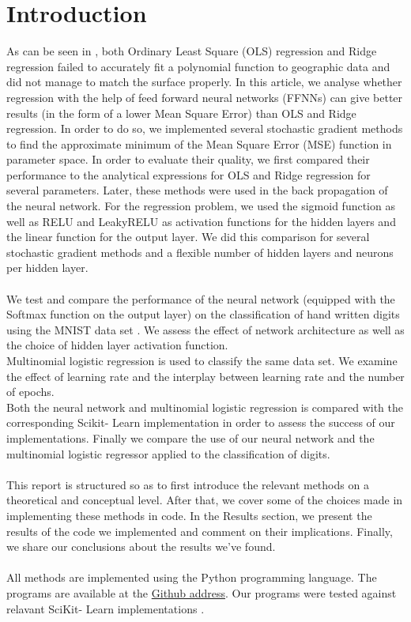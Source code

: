 \documentclass[11pt,a4paper,titlepage]{article}
\begin{document}
\section{Introduction}
As can be seen in \citep{Project1}, both Ordinary Least Square (OLS) regression and  Ridge regression failed to accurately fit a polynomial function to geographic data and did not manage to match the surface properly. In this article, we analyse whether regression with the help of feed forward neural networks (FFNNs) can give better results (in the form of a lower Mean Square Error) than OLS and Ridge regression. In order to do so, we implemented several stochastic gradient methods to find the approximate minimum of the Mean Square Error (MSE) function in parameter space. In order to evaluate their quality, we first compared their performance to the analytical expressions for OLS and Ridge regression for several parameters. Later, these methods were used in the back propagation of the neural network. For the regression problem, we used the sigmoid function as well as RELU and LeakyRELU as activation functions for the hidden layers and the linear function for the output layer. We did this comparison for several stochastic gradient methods and a flexible number of hidden layers and neurons per hidden layer. \\\\We test and compare the performance of the neural network (equipped with the Softmax function on the output layer) on the classification of hand written digits using the MNIST data set \citep{lecun2010mnist}. We assess the effect of network architecture as well as the choice of hidden layer activation function.\\ Multinomial logistic regression is used to classify the same data set. We examine the effect of learning rate and the interplay between learning rate and the number of epochs.\\Both the neural network and multinomial logistic regression is compared with the corresponding Scikit- Learn implementation in order to assess the success of our implementations. Finally we compare the use of our neural network and the multinomial logistic regressor applied to the classification of digits.\\\\This report is structured so as to first introduce the relevant methods on a theoretical and conceptual level. After that, we cover some of the choices made in implementing these methods in code. In the Results section, we present the results of the code we implemented and comment on their implications. Finally, we share our conclusions about the results we've found.\\\\All methods are implemented using the Python programming language. The programs are available at the \href{https://github.com/schraderSimon/FYS-STK/tree/master/project2}{Github address}. Our programs were tested against relavant SciKit- Learn implementations \cite{scikit-learn}.
\end{document}
